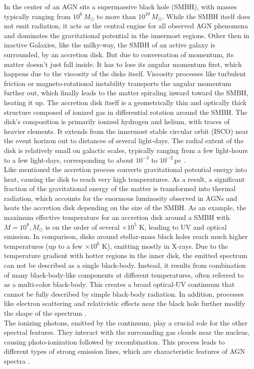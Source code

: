 In the center of an AGN sits a supermassive black hole (SMBH), with masses typically ranging from $10^6\,M_\odot$ to more than $10^{10}\,M_\odot$. While the SMBH itself does not emit radiation, it  acts as the central engine for all observed AGN phenomena and dominates the gravitational potential in the innermost regions. Other then in inactive Galaxies, like the milky-way, the SMBH of an active galaxy is surrounded, by an accretion disk. But due to conversation of momentum, its matter doesn't just fall inside. It has to lose its angular momentum first, which happens due to the viscosity of the disks itself. Viscosity processes like turbulent friction or magneto-rotational instability transports the angular momentum further out, which finally leads to the matter spiraling inward toward the SMBH, heating it up. The accretion disk itself is a geometrically thin and optically thick structure composed of ionized gas in differential rotation around the SMBH. The disk's composition is primarily ionized hydrogen and helium, with traces of heavier elements. It extends from the innermost stable circular orbit (ISCO) near the event horizon out to distances of several light-days. The radial extent of the disk is relatively small on galactic scales, typically ranging from a few light-hours to a few light-days, corresponding to about $10^{-3}$ to $10^{-2}$\,pc \parencite{netzer2013agn,hickox2018obscured, shakura1973black}.  \\
Like mentioned the accretion process converts gravitational potential energy into heat, causing the disk to reach very high temperatures. As a result, a significant fraction of the gravitational energy of the matter is transformed into thermal radiation, which accounts for the enormous luminosity observed in AGNs and heats the accretion disk depending on the size of the SMBH. As an example, the maximum effective temperature for an accretion disk around a SMBH with $M = 10^8,M_\odot$ is on the order of several $\times 10^5$ K, leading to UV and optical emission. In comparison, disks around stellar-mass black holes reach much higher temperatures (up to a few $\times 10^6$ K), emitting mostly in X-rays. Due to the temperature gradient with hotter regions in the inner disk, the emitted spectrum can not be described as a single black-body. Instead, it results from combination of many black-body-like components at different temperatures, often referred to as a multi-color black-body. This creates a broad optical-UV continuum that cannot be fully described by simple black-body radiation. In addition, processes like electron scattering and relativistic effects near the black hole further modify the shape of the spectrum \parencite{osterbrock1989agn}.\\
The ionizing photons, emitted by the continuum, play a crucial role for the other spectral features. They interact with the surrounding gas clouds near the nucleus, causing photo-ionization followed by recombination. This process leads to different types of strong emission lines, which are characteristic features of AGN spectra \parencite{netzer2013agn, osterbrock1989agn}.


